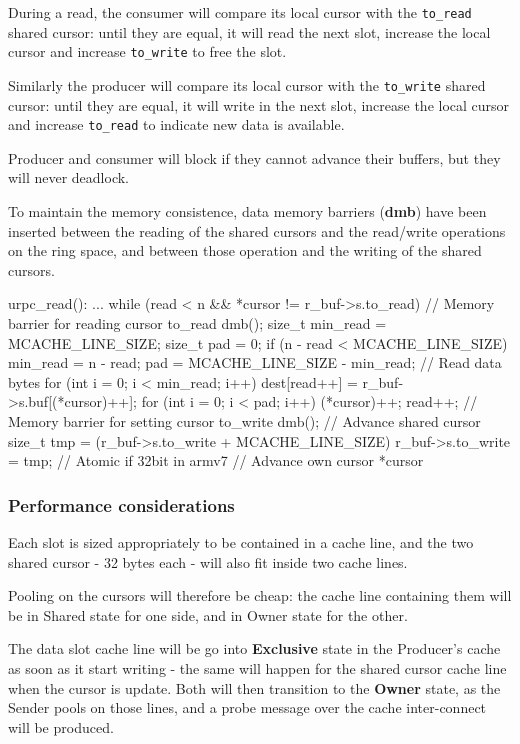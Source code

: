 \documentclass[a4paper,twoside,openright]{report}
\begin{document}
During a read, the consumer will compare its local cursor with the \texttt{to\_read} shared cursor: until they are equal, it will read the next slot, increase the local cursor and increase \texttt{to\_write} to free the slot.

Similarly the producer will compare its local cursor with the \texttt{to\_write} shared cursor: until they are equal, it will write in the next slot, increase the local cursor and increase \texttt{to\_read} to indicate new data is available.

Producer and consumer will block if they cannot advance their buffers, but they will never deadlock.

To maintain the memory consistence, data memory barriers (\textbf{dmb}) have been inserted between the reading of the shared cursors and the read/write operations on the ring space, and between those operation and the writing of the shared cursors.


\begin{pandacode}
urpc_read(): ...
while (read < n && *cursor != r_buf->s.to_read)
	// Memory barrier for reading cursor to_read
	dmb();	
	size_t min_read = MCACHE_LINE_SIZE;
	size_t pad = 0;
	if (n - read < MCACHE_LINE_SIZE)
		min_read = n - read;
		pad = MCACHE_LINE_SIZE - min_read;
	// Read data bytes
	for (int i = 0; i < min_read; i++)
		dest[read++] = r_buf->s.buf[(*cursor)++];
	for (int i = 0; i < pad; i++) 
		(*cursor)++;
		read++;
	// Memory barrier for setting cursor to_write
	dmb();	
	// Advance shared cursor
	size_t tmp = (r_buf->s.to_write + MCACHE_LINE_SIZE) %
	r_buf->s.to_write  = tmp; // Atomic if 32bit in armv7	
	// Advance own cursor
	*cursor %
\end{pandacode}


\subsubsection{Performance considerations}
Each slot is sized appropriately to be contained in a cache line, and the two shared cursor - 32 bytes each - will also fit inside two cache lines.

Pooling on the cursors will therefore be cheap: the cache line containing them will be in Shared state for one side, and in Owner state for the other.

The data slot cache line will be go into \textbf{Exclusive} state in the Producer's cache as soon as it start writing - the same will happen for the shared cursor cache line when the cursor is update. Both will then transition to the \textbf{Owner} state, as the Sender pools on those lines, and a probe message over the cache inter-connect will be produced.
\end{document}
